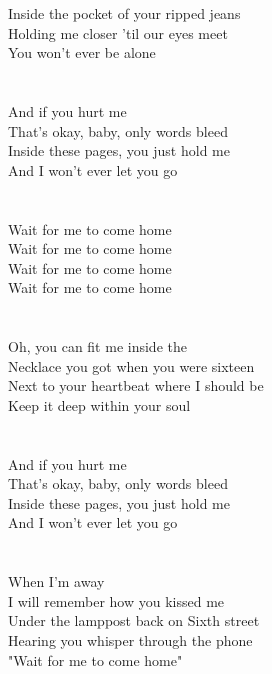 {{Inside the pocket of your ripped jeans\\
Holding me closer 'til our eyes meet\\
You won't ever be alone}\\
\\\noindent\vbox{~\\
And if you hurt me\\
That's okay, baby, only words bleed\\
Inside these pages, you just hold me\\
And I won't ever let you go}\\
\\\noindent\vbox{~\\
Wait for me to come home\\
Wait for me to come home\\
Wait for me to come home\\
Wait for me to come home}\\
\\\noindent\vbox{~\\
Oh, you can fit me inside the\\
Necklace you got when you were sixteen\\
Next to your heartbeat where I should be\\
Keep it deep within your soul}\\
\\\noindent\vbox{~\\
And if you hurt me\\
That's okay, baby, only words bleed\\
Inside these pages, you just hold me\\
And I won't ever let you go}\\
\\\noindent\vbox{~\\
When I'm away\\
I will remember how you kissed me\\
Under the lamppost back on Sixth street\\
Hearing you whisper through the phone\\
"Wait for me to come home"}
}


